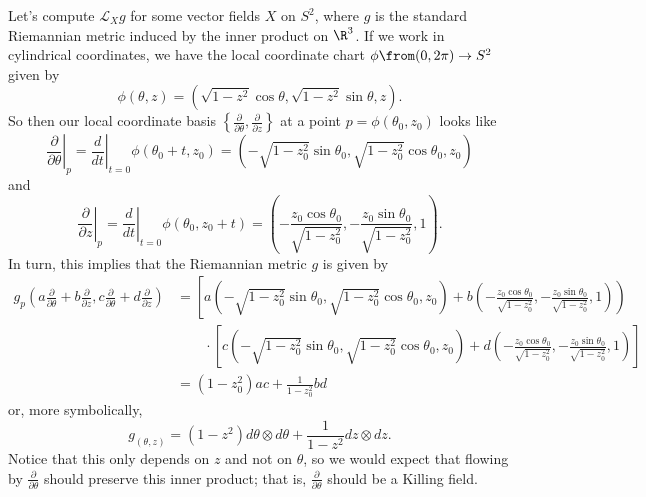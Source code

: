 \begin{example}
	Let's compute $\mathcal{L}_X g$ for some vector fields $X$ on $S^2$, where $g$ is the standard Riemannian metric induced by the inner product on $\R^3$. If we work in cylindrical coordinates, we have the local coordinate chart $\phi\from (0,2\pi) \to S^2$ given by
	\[
		\phi(\theta, z) = \left(\sqrt{1-z^2}\cos \theta, \sqrt{1-z^2} \sin \theta, z\right).
	\]
	So then our local coordinate basis $\left\{\frac{\partial}{\partial \theta}, \frac{\partial}{\partial z} \right\}$ at a point $p = \phi(\theta_0,z_0)$ looks like
	\[
		\left. \frac{\partial}{\partial \theta}\right|_p = \left. \frac{d}{dt} \right|_{t=0} \phi(\theta_0+t,z_0) = \left(-\sqrt{1-z_0^2}\sin\theta_0, \sqrt{1-z_0^2}\cos \theta_0,z_0\right)
	\]
	and
	\[
		\left. \frac{\partial}{\partial z}\right|_p = \left. \frac{d}{dt} \right|_{t=0} \phi(\theta_0,z_0+t) = \left(-\frac{z_0 \cos \theta_0}{\sqrt{1-z_0^2}},-\frac{z_0 \sin \theta_0}{\sqrt{1-z_0^2}},1\right).
	\]
	In turn, this implies that the Riemannian metric $g$ is given by
	\begin{align*}
		g_p\left(a \frac{\partial}{\partial \theta} + b \frac{\partial}{\partial z}, c \frac{\partial}{\partial \theta} + d \frac{\partial}{\partial z}\right) & = \left[a\left(-\sqrt{1-z_0^2}\sin\theta_0, \sqrt{1-z_0^2}\cos \theta_0,z_0\right)+ b\left(-\frac{z_0 \cos \theta_0}{\sqrt{1-z_0^2}},-\frac{z_0 \sin \theta_0}{\sqrt{1-z_0^2}},1\right)\right) \\
		& \qquad \cdot \left[c\left(-\sqrt{1-z_0^2}\sin\theta_0, \sqrt{1-z_0^2}\cos \theta_0,z_0\right)+ d\left(-\frac{z_0 \cos \theta_0}{\sqrt{1-z_0^2}},-\frac{z_0 \sin \theta_0}{\sqrt{1-z_0^2}},1\right)\right]  \\
		& = \left(1-z_0^2\right) ac + \frac{1}{1-z_0^2} bd
	\end{align*}
	or, more symbolically,
	\[
		g_{(\theta,z)} = \left(1-z^2\right) d\theta \otimes d\theta + \frac{1}{1-z^2} dz \otimes dz.
	\]
	Notice that this only depends on $z$ and not on $\theta$, so we would expect that flowing by $\frac{\partial}{\partial \theta}$ should preserve this inner product; that is, $\frac{\partial}{\partial \theta}$ should be a Killing field. 
	

\end{example}
